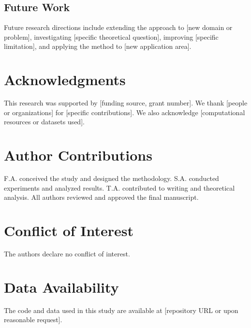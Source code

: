 \documentclass[12pt,a4paper]{article}
\theoremstyle{definition}
\theoremstyle{remark}
\begin{document}
\subsection{Future Work}
\label{subsec:future}

Future research directions include extending the approach to [new domain or problem], investigating [specific theoretical question], improving [specific limitation], and applying the method to [new application area].

\section*{Acknowledgments}

This research was supported by [funding source, grant number]. We thank [people or organizations] for [specific contributions]. We also acknowledge [computational resources or datasets used].

\section*{Author Contributions}

F.A. conceived the study and designed the methodology. S.A. conducted experiments and analyzed results. T.A. contributed to writing and theoretical analysis. All authors reviewed and approved the final manuscript.

\section*{Conflict of Interest}

The authors declare no conflict of interest.

\section*{Data Availability}

The code and data used in this study are available at [repository URL or upon reasonable request].
\end{document}
